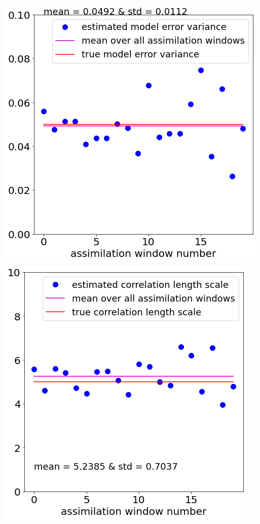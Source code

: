 \documentclass[a4paper,10pt]{article}
\numberwithin{equation}{section}
\begin{document}
\includegraphics[scale=0.4]{Ex5var}
\includegraphics[scale=0.4]{Ex5len}\\
\end{document}
